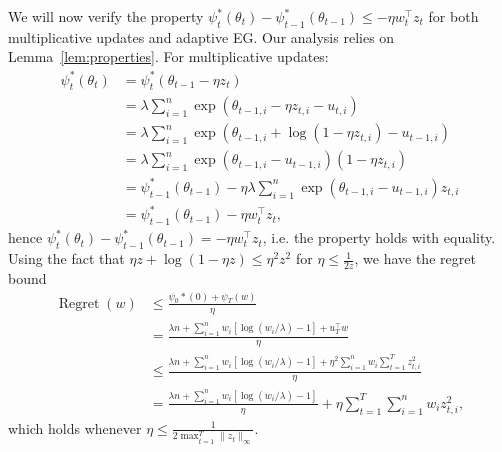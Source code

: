 \documentclass[11pt]{article}
\DeclareMathOperator{\Regret}{Regret}
\begin{document}
We will now verify the property $\psi_t^*(\theta_t) - \psi_{t-1}^*(\theta_{t-1}) \leq -\eta w_t^{\top}z_t$ 
for both multiplicative updates and adaptive EG. Our analysis relies on Lemma~\ref{lem:properties}.
For multiplicative updates:
\begin{align}
        \psi_t^*(\theta_t) &= \psi_t^*(\theta_{t-1}- \eta z_t) \\
                           &= \lambda \sum_{i=1}^n \exp\left(\theta_{t-1,i} - \eta z_{t,i} - u_{t,i}\right) \\
                           &= \lambda \sum_{i=1}^n \exp\left(\theta_{t-1,i} + \log(1- \eta z_{t,i}) - u_{t-1,i}\right) \\
                           &= \lambda \sum_{i=1}^n \exp\left(\theta_{t-1,i} - u_{t-1,i}\right)(1 - \eta z_{t,i}) \\
                           &= \psi_{t-1}^*(\theta_{t-1}) - \eta \lambda \sum_{i=1}^n \exp\left(\theta_{t-1,i} - u_{t-1,i}\right) z_{t,i} \\
                           &= \psi_{t-1}^*(\theta_{t-1}) - \eta w_t^{\top}z_t,
\end{align}
hence $\psi_t^*(\theta_t) - \psi_{t-1}^*(\theta_{t-1}) = -\eta w_t^{\top}z_t$, i.e. the property holds with equality. Using the 
fact that $\eta z + \log(1-\eta z) \leq \eta^2 z^2$ for $\eta \leq \frac{1}{2z}$, we have the regret bound
\begin{align}
        \Regret(w) &\leq \frac{\psi_0*(0) + \psi_T(w)}{\eta} \\
                   &= \frac{\lambda n + \sum_{i=1}^n w_i[\log(w_i/\lambda)-1] + u_T^{\top}w}{\eta} \\
                   &\leq \frac{\lambda n + \sum_{i=1}^n w_i[\log(w_i/\lambda)-1] + \eta^2 \sum_{i=1}^n w_i \sum_{t=1}^T z_{t,i}^2}{\eta} \\
                   &= \frac{\lambda n + \sum_{i=1}^n w_i[\log(w_i/\lambda)-1]}{\eta} + \eta \sum_{t=1}^T \sum_{i=1}^n w_i z_{t,i}^2,
\end{align}
which holds whenever $\eta \leq \frac{1}{2 \max_{t=1}^T \|z_t\|_{\infty}}$. 
\end{document}
